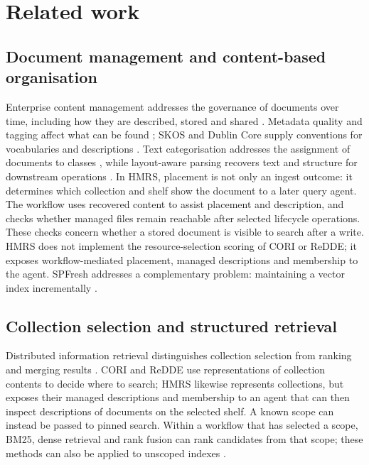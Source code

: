 \section{Related work}
\label{sec:related}

\subsection{Document management and content-based organisation}

Enterprise content management addresses the governance of documents over
time, including how they are described, stored and shared
\citep{paivarinta-ecm-2005,tyrvaainen-ecm-2006}. Metadata quality and tagging
affect what can be found \citep{park-metadata-quality-2009,golder-tagging-2006};
SKOS and Dublin Core supply conventions for vocabularies and descriptions
\citep{skos,dcmi-terms}. Text categorisation addresses the assignment of
documents to classes \citep{sebastiani2002machine}, while layout-aware parsing
recovers text and structure for downstream operations
\citep{zhong-publaynet-layout-2019,huang-layoutlmv3-docai-2022,mineru}.
In HMRS, placement is not only an ingest outcome: it determines which
collection and shelf show the document to a later query agent. The workflow
uses recovered content to assist placement and description, and checks
whether managed files remain reachable after selected lifecycle operations.
These checks concern whether a stored document is visible to search after a
write. HMRS does not implement the resource-selection scoring of CORI or
ReDDE; it exposes workflow-mediated placement, managed descriptions and
membership to the agent. SPFresh addresses a complementary problem:
maintaining a vector index incrementally
\citep{xu2023spfresh}.

\subsection{Collection selection and structured retrieval}

Distributed information retrieval distinguishes collection selection from
ranking and merging results \citep{callan1995searching,si2003redde,shokouhi-federated-2011}.
CORI and ReDDE use representations of collection contents to decide where
to search; HMRS likewise represents collections, but exposes their managed
descriptions and membership to an agent that can then inspect descriptions
of documents on the selected shelf. A known scope can instead be passed to
pinned search. Within a workflow that has selected a scope, BM25, dense
retrieval and rank fusion can rank candidates from that scope; these methods
can also be applied to unscoped indexes
\citep{bm25,dpr,rrf-cormack,bge-m3}.

